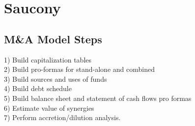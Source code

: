 \section{Saucony}
	\subsection*{M\&A Model Steps}
	1) Build capitalization tables\\
	2) Build pro-formas for stand-alone and combined\\
	3) Build sources and uses of funds\\
	4) Build debt schedule\\
	5) Build balance sheet and statement of cash flows pro formas\\
	6) Estimate value of synergies\\
	7) Perform accretion/dilution analysis.

